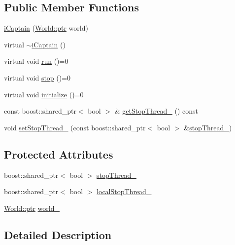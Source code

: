 \subsection*{Public Member Functions}
\begin{DoxyCompactItemize}
\item 
\hyperlink{classo_cpt_1_1i_captain_a23cd0cb920d48da605e9c8266e6448a9}{i\+Captain} (\hyperlink{classo_cpt_1_1_world_aa6e591e3096d5de71e0cec9039663d67}{World\+::ptr} world)
\item 
virtual \hyperlink{classo_cpt_1_1i_captain_a32e37b6a4952f59c1b315d54bf84bb3f}{$\sim$i\+Captain} ()
\item 
virtual void \hyperlink{classo_cpt_1_1i_captain_a53d61f2d68b435f32ad66858ae898763}{run} ()=0
\item 
virtual void \hyperlink{classo_cpt_1_1i_captain_aeda385ea9a0ee33301dfda05098c836b}{stop} ()=0
\item 
virtual void \hyperlink{classo_cpt_1_1i_captain_a5ad7947dde7866981c76ccd3a30ce4ce}{initialize} ()=0
\item 
const boost\+::shared\+\_\+ptr$<$ bool $>$ \& \hyperlink{classo_cpt_1_1i_captain_ae59d378b21d0f385d0a8c4ade2768529}{get\+Stop\+Thread\+\_\+} () const
\item 
void \hyperlink{classo_cpt_1_1i_captain_ad430c275b858faa6eee0be6cc0c8ea26}{set\+Stop\+Thread\+\_\+} (const boost\+::shared\+\_\+ptr$<$ bool $>$ \&\hyperlink{classo_cpt_1_1i_captain_a867451cb05e5073d61c0b6a2d0e7389c}{stop\+Thread\+\_\+})
\end{DoxyCompactItemize}
\subsection*{Protected Attributes}
\begin{DoxyCompactItemize}
\item 
boost\+::shared\+\_\+ptr$<$ bool $>$ \hyperlink{classo_cpt_1_1i_captain_a867451cb05e5073d61c0b6a2d0e7389c}{stop\+Thread\+\_\+}
\item 
boost\+::shared\+\_\+ptr$<$ bool $>$ \hyperlink{classo_cpt_1_1i_captain_aaa8f3eba679429337bc7078a8c1a45ac}{local\+Stop\+Thread\+\_\+}
\item 
\hyperlink{classo_cpt_1_1_world_aa6e591e3096d5de71e0cec9039663d67}{World\+::ptr} \hyperlink{classo_cpt_1_1i_captain_a6e08906c347d5fc66605bfde73046194}{world\+\_\+}
\end{DoxyCompactItemize}


\subsection{Detailed Description}


